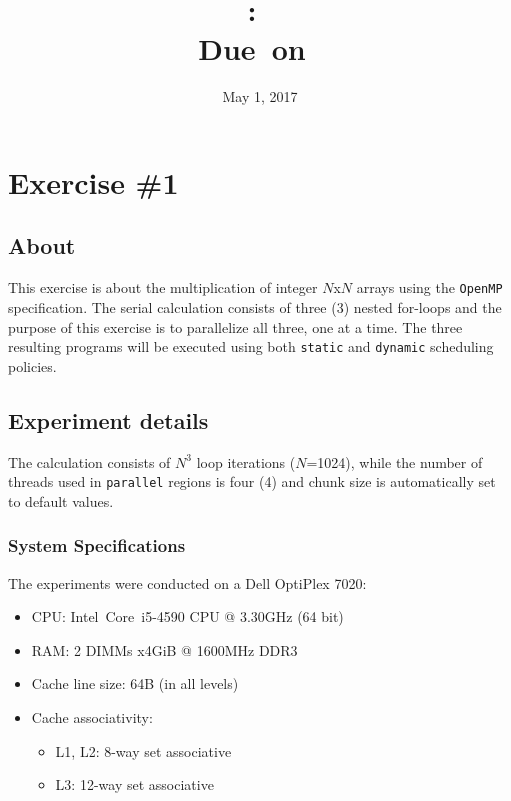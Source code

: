\documentclass{article}
\title{
\vspace{2in}
\textmd{\textbf{\hmwkClass:\ \hmwkTitle}}\\
\normalsize\vspace{0.1in}\small{Due\ on\ \hmwkDueDate}\\
\vspace{0.1in}\large{\textit{\hmwkClassInstructor}}
\vspace{3in}
}
\author{\textbf{\hmwkAuthorName}}
\date{May 1, 2017} %
\def\code#1{\texttt{#1}}
\begin{document}
\maketitle


\newpage
\tableofcontents
\newpage



\section{Exercise \#1}

\subsection{About}
This exercise is about the multiplication of integer $N$x$N$ arrays using the \texttt{OpenMP}
specification. The serial calculation consists of three (3) nested for-loops and the purpose of
this exercise is to parallelize all three, one at a time. The three resulting programs will be
executed using both \code{static} and \code{dynamic} scheduling policies.

\subsection{Experiment details}
The calculation consists of $N^3$ loop iterations ($N$=1024), while the number of threads
used in \code{parallel} regions is four (4) and chunk size is automatically set to default
values.

\subsubsection{System Specifications}
The experiments were conducted on a Dell OptiPlex 7020:
\begin{itemize}
 \item CPU: Intel\textregistered \ Core\texttrademark \ i5-4590 CPU @ 3.30GHz (64 bit)
 \item RAM: 2 DIMMs x4GiB @ 1600MHz DDR3
 \item Cache line size: 64B (in all levels)
 \item Cache associativity:
 \begin{itemize}
  \item L1, L2: 8-way set associative
  \item L3: 12-way set associative
 \end{itemize}
\end{itemize}
\end{document}
